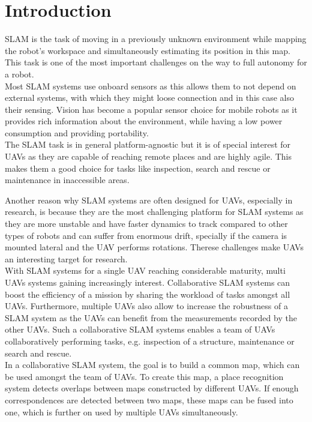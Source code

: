 \chapter{Introduction}
\label{sec:introduction}

\acf{SLAM} is the task of moving in a previously unknown environment while mapping the robot’s workspace and simultaneously estimating its position in this map. This task is one of the most important challenges on the way to full autonomy for a robot.\\

Most \ac{SLAM} systems use onboard sensors as this allows them to not depend on external systems, with which they might loose connection and in this case also their sensing. Vision has become a popular sensor choice for mobile robots as it provides rich information about the environment, while having a low power consumption and providing portability.\\

The \ac{SLAM} task is in general platform-agnostic but it is of special interest for \acfp{UAV} as they are capable of reaching remote places and are highly agile. This makes them a good choice for tasks like inspection, search and rescue or maintenance in inaccessible areas. 

Another reason why \ac{SLAM} systems are often designed for \acp{UAV}, especially in research, is because they are the most challenging platform for \ac{SLAM} systems as they are more unstable and have faster dynamics to track compared to other types of robots and can suffer from enormous drift, specially if the camera is mounted lateral and the \ac{UAV} performs rotations. Therese challenges make \acp{UAV} an interesting target for research.\\

With \ac{SLAM} systems for a single \ac{UAV} reaching considerable maturity, multi \acp{UAV} systems gaining increasingly interest. Collaborative \ac{SLAM} systems can boost the efficiency of a mission by sharing the workload of tasks amongst all \acp{UAV}. Furthermore, multiple \acp{UAV} also allow to increase the robustness of a \ac{SLAM} system as the \acp{UAV} can benefit from the measurements recorded by the other \acp{UAV}. Such a collaborative \ac{SLAM} systems enables a team of \acp{UAV} collaboratively performing tasks, e.g. inspection of a structure, maintenance or search and rescue.\\

In a collaborative \ac{SLAM} system, the goal is to build a common map, which can be used amongst the team of \acp{UAV}. To create this map, a place recognition system detects overlaps between maps constructed by different \acp{UAV}. If enough correspondences are detected between two maps, these maps can be fused into one, which is further on used by multiple \acp{UAV} simultaneously.\\

